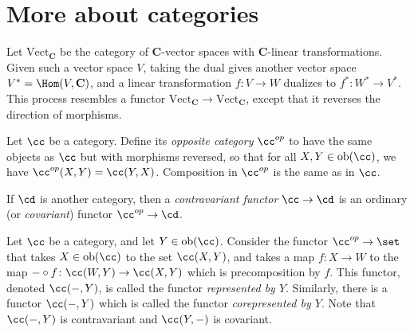 \section{More about categories}
Let $\mathrm{Vect}_{\mathbf{C}}$ be the category of $\mathbf{C}$-vector spaces with $\mathbf{C}$-linear transformations. Given such a vector space $V$, taking the dual gives another vector space $V^\ast=\Hom(V,\mathbf{C})$, and a linear transformation $f:V\to W$ dualizes to $f^\ast:W^\ast\to V^\ast$. This process resembles a functor $\mathrm{Vect}_{\mathbf{C}} \to \mathrm{Vect}_{\mathbf{C}}$, except that it reverses the direction of morphisms.
\begin{definition}
Let $\cc$ be a category. Define its \emph{opposite category} $\cc^{op}$ to have the same objects as $\cc$ but with morphisms reversed, so that for all $X,Y\in\mathrm{ob}(\cc)$, we have $\cc^{op}(X,Y) = \cc(Y,X)$. Composition in $\cc^{op}$ is the same as in $\cc$.

If $\cd$ is another category, then a \emph{contravariant functor} $\cc\to \cd$ is an ordinary (or \emph{covariant}) functor $\cc^{op}\to\cd$.
\end{definition}
Let $\cc$ be a category, and let $Y\in\mathrm{ob}(\cc)$. Consider the functor $\cc^{op}\to\set$ that takes $X\in\mathrm{ob}(\cc)$ to the set $\cc(X,Y)$, and takes a map $f\colon X\to W$ to the map $-\circ f\colon \cc(W,Y)\to \cc(X,Y)$ which is precomposition by $f$. This functor, denoted $\cc(-,Y)$, is called the functor \emph{represented by $Y$}. Similarly, there is a functor $\cc(-,Y)$ which is called the functor \emph{corepresented by $Y$}. Note that $\cc(-,Y)$ is contravariant and $\cc(Y,-)$ is covariant.

